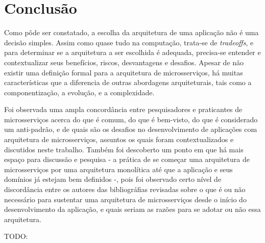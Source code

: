 \chapter{Conclusão}\label{chapter-conclusao}

Como pôde ser constatado, a escolha da arquitetura de uma aplicação não é uma decisão simples. Assim como quase tudo na computação, trata-se de \emph{tradeoffs}, e para determinar se a arquitetura a ser escolhida é adequada, precisa-se entender e contextualizar seus benefícios, riscos, desvantagens e desafios. Apesar de não existir uma definição formal para a arquitetura de microsserviços, há muitas características que a diferencia de outras abordagens arquiteturais, tais como a componentização, a evolução, e a complexidade.

Foi observada uma ampla concordância entre pesquisadores e praticantes de microsserviços acerca do que é comum, do que é bem-visto, do que é considerado um anti-padrão, e de quais são os desafios no desenvolvimento de aplicações com arquitetura de microsserviços, assuntos os quais foram contextualizados e discutidos neste trabalho. Também foi descoberto um ponto em que há mais espaço para discussão e pesquisa - a prática de se começar uma arquitetura de microsserviços por uma arquitetura monolítica até que a aplicação e seus domínios já estejam bem definidos -, pois foi observado certo nível de discordância entre os autores das bibliográfias revisadas sobre o que é ou não necessário para sustentar uma arquitetura de microsserviços desde o início do desenvolvimento da aplicação, e quais seriam as razões para se adotar ou não essa arquitetura.

TODO:




